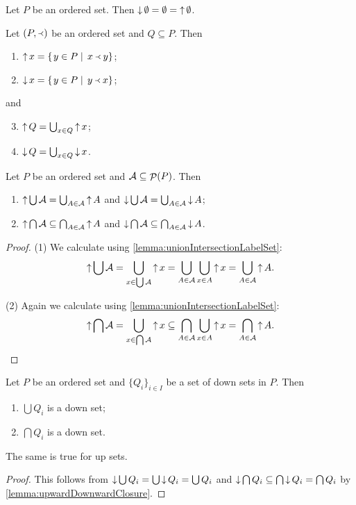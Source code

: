 \begin{lemma}
Let $P$ be an ordered set. Then $\mathop{\downarrow}\emptyset = \emptyset = \mathop{\uparrow}\emptyset$.
\end{lemma}

\begin{lemma}
Let $\left( P, \Yleft \right)$ be an ordered set and $Q\subseteq P$. Then
\begin{enumerate}
\item $\mathop{\uparrow} x = \left\{\left. y\in P \;\right|\; x\Yleft y \right\}$;
\item $\mathop{\downarrow} x = \left\{\left. y\in P \;\right|\; y\Yleft x \right\}$;
\end{enumerate}
and
\begin{enumerate} \setcounter{enumi}{2}
\item $\mathop{\uparrow} Q = \bigcup_{x\in Q} \mathop{\uparrow} x$;
\item $\mathop{\downarrow} Q = \bigcup_{x\in Q} \mathop{\downarrow} x$.
\end{enumerate}
\end{lemma}
\begin{corollary} \label{lemma:upDownsetUnionIntersection}
Let $P$ be an ordered set and $\mathcal{A}\subseteq \mathop{\mathcal{P}}(P)$. Then
\begin{enumerate}
\item $\mathop{\uparrow} \bigcup \mathcal{A} = \bigcup_{A\in \mathcal{A}} \mathop{\uparrow} A$ and $\mathop{\downarrow} \bigcup \mathcal{A} = \bigcup_{A\in \mathcal{A}} \mathop{\downarrow} A$;
\item $\mathop{\uparrow} \bigcap \mathcal{A} \subseteq \bigcap_{A\in \mathcal{A}} \mathop{\uparrow} A$ and $\mathop{\downarrow} \bigcap \mathcal{A} \subseteq \bigcap_{A\in \mathcal{A}} \mathop{\downarrow} A$.
\end{enumerate}
\end{corollary}
\begin{proof}
(1) We calculate using \ref{lemma:unionIntersectionLabelSet}:
\[ \mathop{\uparrow} \bigcup \mathcal{A} = \bigcup_{x\in \bigcup\mathcal{A}} \mathop{\uparrow} x = \bigcup_{A\in \mathcal{A}}\bigcup_{x\in A}\mathop{\uparrow} x = \bigcup_{A\in \mathcal{A}} \mathop{\uparrow} A. \]

(2) Again we calculate using \ref{lemma:unionIntersectionLabelSet}:
\[ \mathop{\uparrow} \bigcap \mathcal{A} = \bigcup_{x\in \bigcap\mathcal{A}} \mathop{\uparrow} x \subseteq \bigcap_{A\in \mathcal{A}}\bigcup_{x\in A}\mathop{\uparrow} x = \bigcap_{A\in \mathcal{A}} \mathop{\uparrow} A. \]
\end{proof}
\begin{corollary} \label{lemma:unionIntersectionDownUpSets}
Let $P$ be an ordered set and $\{Q_i\}_{i\in I}$ be a set of down sets in $P$. Then
\begin{enumerate}
\item $\bigcup Q_i$ is a down set;
\item $\bigcap Q_i$ is a down set.
\end{enumerate}
The same is true for up sets.
\end{corollary}
\begin{proof}
This follows from $\mathop{\downarrow} \bigcup Q_i = \bigcup \mathop{\downarrow} Q_i = \bigcup Q_i$ and $\mathop{\downarrow} \bigcap Q_i \subseteq \bigcap \mathop{\downarrow} Q_i = \bigcap Q_i$ by \ref{lemma:upwardDownwardClosure}.
\end{proof}


